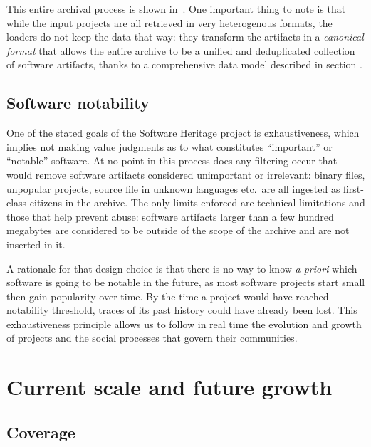 This entire archival process is shown in~. One
important thing to note is that while the input projects are all retrieved in
very heterogenous formats, the loaders do not keep the data that way: they
transform the artifacts in a \emph{canonical format} that allows the entire
archive to be a unified and deduplicated collection of software artifacts,
thanks to a comprehensive data model described in section \TODO{}.

\subsection{Software notability}

One of the stated goals of the Software Heritage project is exhaustiveness,
which implies not making value judgments as to what constitutes ``important''
or ``notable'' software. At no point in this process does any filtering occur
that would remove software artifacts considered unimportant or irrelevant:
binary files, unpopular projects, source file in unknown languages etc.\ are
all ingested as first-class citizens in the archive. The only limits enforced
are technical limitations and those that help prevent abuse: software artifacts
larger than a few hundred megabytes are considered to be outside of the scope
of the archive and are not inserted in it.

A rationale for that design choice is that there is no way to know \emph{a
priori} which software is going to be notable in the future, as most software
projects start small then gain popularity over time. By the time a project
would have reached notability threshold, traces of its past history could have
already been lost. This exhaustiveness principle allows us to follow in real
time the evolution and growth of projects and the social processes that govern
their communities.

\section{Current scale and future growth}

\subsection{Coverage}

